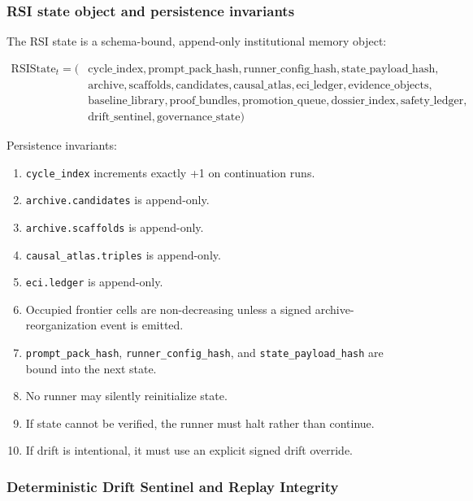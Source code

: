 \subsubsection{RSI state object and persistence
invariants}\label{rsi-state-object-and-persistence-invariants}

The RSI state is a schema-bound, append-only institutional memory
object:

\[
\begin{aligned}
\mathrm{RSIState}_t = (&
\mathrm{cycle\_index},
\mathrm{prompt\_pack\_hash},
\mathrm{runner\_config\_hash},
\mathrm{state\_payload\_hash},\\
&\mathrm{archive},
\mathrm{scaffolds},
\mathrm{candidates},
\mathrm{causal\_atlas},
\mathrm{eci\_ledger},
\mathrm{evidence\_objects},\\
&\mathrm{baseline\_library},
\mathrm{proof\_bundles},
\mathrm{promotion\_queue},
\mathrm{dossier\_index},
\mathrm{safety\_ledger},\\
&\mathrm{drift\_sentinel},
\mathrm{governance\_state})
\end{aligned}
\]

Persistence invariants:

\begin{enumerate}
\def\labelenumi{\arabic{enumi}.}
\tightlist
\item
  \texttt{cycle\_index} increments exactly +1 on continuation runs.
\item
  \texttt{archive.candidates} is append-only.
\item
  \texttt{archive.scaffolds} is append-only.
\item
  \texttt{causal\_atlas.triples} is append-only.
\item
  \texttt{eci.ledger} is append-only.
\item
  Occupied frontier cells are non-decreasing unless a signed
  archive-reorganization event is emitted.
\item
  \texttt{prompt\_pack\_hash}, \texttt{runner\_config\_hash}, and
  \texttt{state\_payload\_hash} are bound into the next state.
\item
  No runner may silently reinitialize state.
\item
  If state cannot be verified, the runner must halt rather than
  continue.
\item
  If drift is intentional, it must use an explicit signed drift
  override.
\end{enumerate}

\subsubsection{Deterministic Drift Sentinel and Replay
Integrity}\label{deterministic-drift-sentinel-and-replay-integrity}

